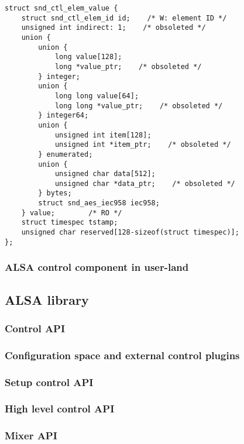 \documentclass[onecolumn]{article}
\begin{document}
\begin{verbatim}
struct snd_ctl_elem_value {
    struct snd_ctl_elem_id id;    /* W: element ID */
    unsigned int indirect: 1;    /* obsoleted */
    union {
        union {
            long value[128];
            long *value_ptr;    /* obsoleted */
        } integer;
        union {
            long long value[64];
            long long *value_ptr;    /* obsoleted */
        } integer64;
        union {
            unsigned int item[128];
            unsigned int *item_ptr;    /* obsoleted */
        } enumerated;
        union {
            unsigned char data[512];
            unsigned char *data_ptr;    /* obsoleted */
        } bytes;
        struct snd_aes_iec958 iec958;
    } value;        /* RO */
    struct timespec tstamp;
    unsigned char reserved[128-sizeof(struct timespec)];
};
\end{verbatim}

\subsubsection{ALSA control component in user-land}

\subsection{ALSA library}

\subsubsection{Control API}

\subsubsection{Configuration space and external control plugins}

\subsubsection{Setup control API}

\subsubsection{High level control API}

\subsubsection{Mixer API}
\end{document}

